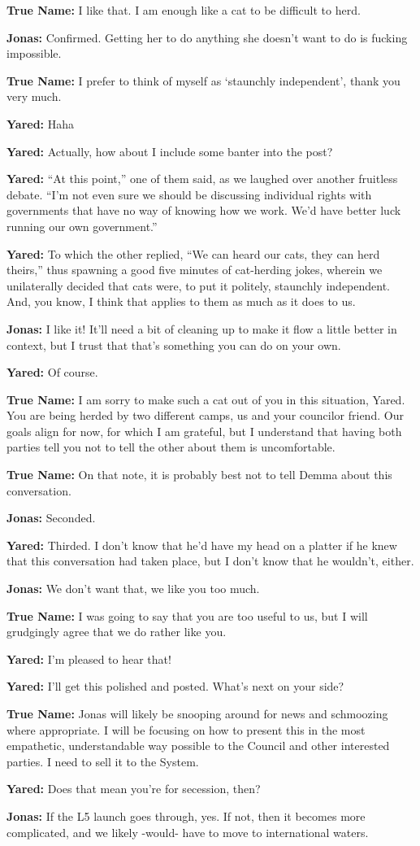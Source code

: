 \textbf{True Name:} I like that. I am enough like a cat to be difficult to herd.

\textbf{Jonas:} Confirmed. Getting her to do anything she doesn't want to do is fucking impossible.

\textbf{True Name:} I prefer to think of myself as `staunchly independent', thank you very much.

\textbf{Yared:} Haha

\textbf{Yared:} Actually, how about I include some banter into the post?

\textbf{Yared:} ``At this point,'' one of them said, as we laughed over another fruitless debate. ``I'm not even sure we should be discussing individual rights with governments that have no way of knowing how we work. We'd have better luck running our own government.''

\textbf{Yared:} To which the other replied, ``We can heard our cats, they can herd theirs,'' thus spawning a good five minutes of cat-herding jokes, wherein we unilaterally decided that cats were, to put it politely, staunchly independent. And, you know, I think that applies to them as much as it does to us.

\textbf{Jonas:} I like it! It'll need a bit of cleaning up to make it flow a little better in context, but I trust that that's something you can do on your own.

\textbf{Yared:} Of course.

\textbf{True Name:} I am sorry to make such a cat out of you in this situation, Yared. You are being herded by two different camps, us and your councilor friend. Our goals align for now, for which I am grateful, but I understand that having both parties tell you not to tell the other about them is uncomfortable.

\textbf{True Name:} On that note, it is probably best not to tell Demma about this conversation.

\textbf{Jonas:} Seconded.

\textbf{Yared:} Thirded. I don't know that he'd have my head on a platter if he knew that this conversation had taken place, but I don't know that he wouldn't, either.

\textbf{Jonas:} We don't want that, we like you too much.

\textbf{True Name:} I was going to say that you are too useful to us, but I will grudgingly agree that we do rather like you.

\textbf{Yared:} I'm pleased to hear that!

\textbf{Yared:} I'll get this polished and posted. What's next on your side?

\textbf{True Name:} Jonas will likely be snooping around for news and schmoozing where appropriate. I will be focusing on how to present this in the most empathetic, understandable way possible to the Council and other interested parties. I need to sell it to the System.

\textbf{Yared:} Does that mean you're for secession, then?

\textbf{Jonas:} If the L5 launch goes through, yes. If not, then it becomes more complicated, and we likely -would- have to move to international waters.
